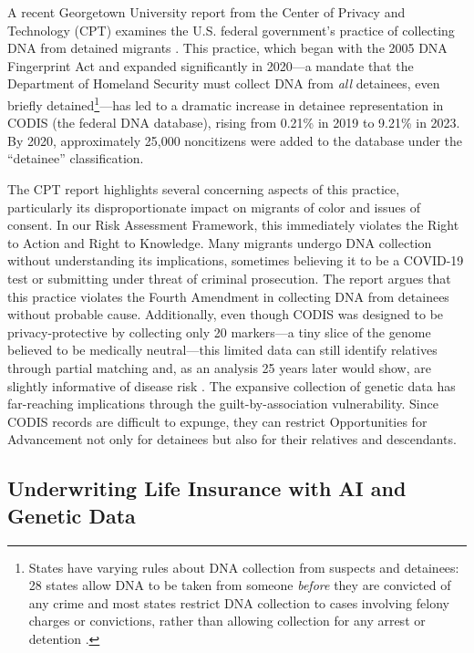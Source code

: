 A recent Georgetown University report from the Center of Privacy and Technology (CPT) examines the U.S. federal government's practice of collecting DNA from detained migrants \cite{glaberson_raiding_2024}. This practice, which began with the 2005 DNA Fingerprint Act and expanded significantly in 2020—a mandate that the Department of Homeland Security must collect DNA from \textit{all} detainees, even briefly detained\footnote{States have varying rules about DNA collection from suspects and detainees: 28 states allow DNA to be taken from someone \textit{before} they are convicted of any crime and most states restrict DNA collection to cases involving felony charges or convictions, rather than allowing collection for any arrest or detention \cite{samuels_collecting_dna_2012}.}—has led to a dramatic increase in detainee representation in CODIS (the federal DNA database), rising from 0.21\% in 2019 to 9.21\% in 2023. By 2020, approximately 25,000 noncitizens were added to the database under the ``detainee'' classification.

The CPT report highlights several concerning aspects of this practice, particularly its disproportionate impact on migrants of color and issues of consent. In our Risk Assessment Framework, this immediately violates the Right to Action and Right to Knowledge. Many migrants undergo DNA collection without understanding its implications, sometimes believing it to be a COVID-19 test or submitting under threat of criminal prosecution. The report argues that this practice violates the Fourth Amendment in collecting DNA from detainees without probable cause. Additionally, even though CODIS was designed to be privacy-protective by collecting only 20 markers—a tiny slice of the genome believed to be medically neutral—this limited data can still identify relatives through partial matching and, as an analysis 25 years later would show, are slightly informative of disease risk \cite{banuelos_associations_2022}. The expansive collection of genetic data has far-reaching implications through the guilt-by-association vulnerability. Since CODIS records are difficult to expunge, they can restrict Opportunities for Advancement not only for detainees but also for their relatives and descendants.

\subsection{Underwriting Life Insurance with AI and Genetic Data}
\label{case:insurance}

